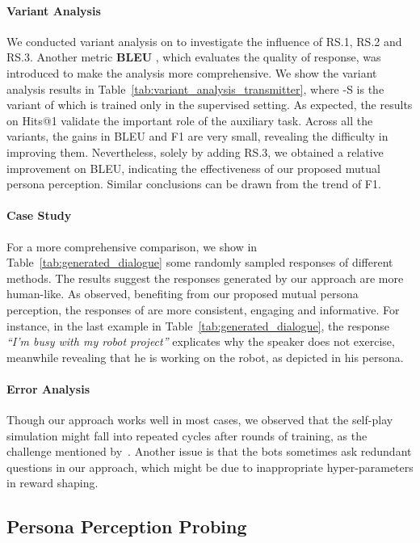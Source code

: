 \documentclass[11pt,a4paper]{article}
\begin{document}
\paragraph{Variant Analysis} We conducted variant analysis on  to investigate the influence of RS.1, RS.2 and RS.3. Another metric \textbf{BLEU} \cite{papineni-etal-2002-bleu}, which evaluates the quality of response, was introduced to make the analysis more comprehensive. We show the variant analysis results in Table~\ref{tab:variant_analysis_transmitter}, where -S is the variant of  which is trained only in the supervised setting. As expected, the results on Hits@1 validate the important role of the auxiliary task. Across all the variants, the gains in BLEU and F1 are very small, revealing the difficulty in improving them. Nevertheless, solely by adding RS.3, we obtained a  relative improvement on BLEU, indicating the effectiveness of our proposed mutual persona perception. Similar conclusions can be drawn from the trend of F1.

\paragraph{Case Study} For a more comprehensive comparison, we show in Table~\ref{tab:generated_dialogue} some randomly sampled responses of different methods. The results suggest the responses generated by our approach are more human-like. As observed, benefiting from our proposed mutual persona perception, the responses of  are more consistent, engaging and informative. For instance, in the last example in Table~\ref{tab:generated_dialogue}, the response \textit{``I'm busy with my robot project''} explicates why the speaker does not exercise, meanwhile revealing that he is working on the robot, as depicted in his persona.

\paragraph{Error Analysis} Though our approach works well in most cases, we observed that the self-play simulation might fall into repeated cycles after rounds of training, as the challenge mentioned by~\citet{li2016deep}. Another issue is that the bots sometimes ask redundant questions in our approach, which might be due to inappropriate hyper-parameters in reward shaping.


\subsection{Persona Perception Probing}\label{sec:receiver discussion}
\end{document}
